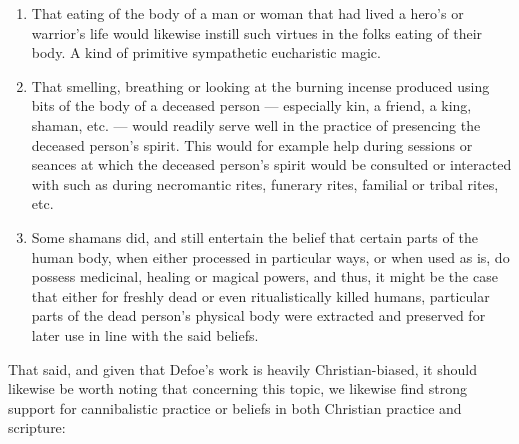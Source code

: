 \documentclass[a4paper]{article}
\begin{document}
\begin{enumerate}
\item That eating of the body of a man or woman that had lived a hero's or warrior's life would likewise instill such virtues in the folks eating of their body. A kind of primitive sympathetic eucharistic magic.
\item That smelling, breathing or looking at the burning incense produced using bits of the body of a deceased person --- especially kin, a friend, a king, shaman, etc. --- would readily serve well in the practice of presencing the deceased person's spirit. This would for example help during sessions or seances at which the deceased person's spirit would be consulted or interacted with such as during necromantic rites, funerary rites, familial or tribal rites, etc.
\item Some shamans did, and still entertain the belief that certain parts of the human body, when either processed in particular ways, or when used as is, do possess medicinal, healing or magical powers, and thus, it might be the case that either for freshly dead or even ritualistically killed humans, particular parts of the dead person's physical body were extracted and preserved for later use in line with the said beliefs. 
\end{enumerate}


That said, and given that Defoe's work is heavily Christian-biased, it should likewise be worth noting that concerning this topic, we likewise find strong support for cannibalistic practice or beliefs in both Christian practice and scripture:
\end{document}
